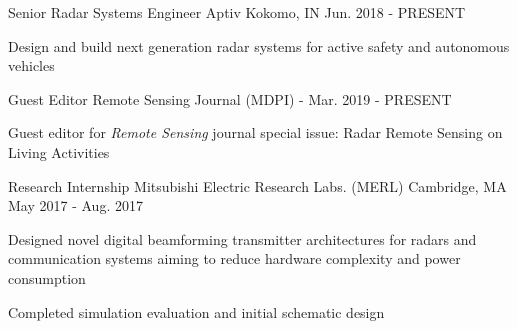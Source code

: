
\begin{cventries}

  \cventry
    {Senior Radar Systems Engineer} %
    {Aptiv} %
    {Kokomo, IN} %
    {Jun. 2018 - PRESENT} %
    {
      \begin{cvitems} %
        \item {Design and build next generation radar systems for active safety and autonomous vehicles}
      \end{cvitems}
    }
    
  \cventry
    {Guest Editor} %
    {Remote Sensing Journal (MDPI)} %
    {-} %
    {Mar. 2019 - PRESENT} %
    {
      \begin{cvitems} %
        \item {Guest editor for {\em{Remote Sensing}} journal special issue: Radar Remote Sensing on Living Activities}
      \end{cvitems}
    }

  \cventry
    {Research Internship} %
    {Mitsubishi Electric Research Labs. (MERL)} %
    {Cambridge, MA} %
    {May 2017 - Aug. 2017} %
    {
      \begin{cvitems} %
        \item {Designed novel digital beamforming transmitter architectures for radars and communication systems aiming to reduce hardware complexity and power consumption}
        \item {Completed simulation evaluation and initial schematic design}
      \end{cvitems}
    }

\end{cventries}

